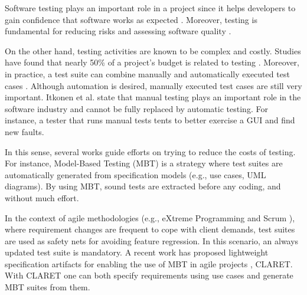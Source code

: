 Software testing plays an important role in a project since it helps developers to gain confidence that software works as expected \cite{Pressman:2007}. Moreover, testing is fundamental for reducing risks and assessing software quality \cite{Pressman:2007}.


On the other hand, testing activities are known to be complex and costly. Studies have found that nearly 50\% of a project's budget is related to testing \cite{kumar2016impacts}. Moreover, in practice, a test suite can combine manually and automatically executed test cases \cite{manualtesting:2009:Itkonen}. Although automation is desired, manually executed test cases are still very important. Itkonen et al. \cite{manualtesting:2009:Itkonen} state that manual testing plays an important role in the software industry and cannot be fully replaced by automatic testing. For instance, a tester that runs manual tests tents to better exercise a GUI and find new faults.

In this sense, several works guide efforts on trying to reduce the costs of testing. For instance, Model-Based Testing (MBT) \cite{dalal:mbt:1999,Utting:2006:PMT:1200168} is a strategy where test suites are automatically generated from specification models (e.g., use cases, UML diagrams). By using MBT, sound tests are extracted before any coding, and without much effort.

In the context of agile methodologies (e.g., eXtreme Programming \cite{beck2000extremeprogramming} and Scrum \cite{sutherland2014scrum}), where requirement changes are frequent to cope with client demands, test suites are used as safety nets for avoiding feature regression. In this scenario, an always updated test suite is mandatory. A recent work has proposed lightweight specification artifacts for enabling the use of MBT in agile projects \cite{dalton2018mbtagile}, CLARET. With CLARET one can both specify requirements using use cases and generate MBT suites from them.  

